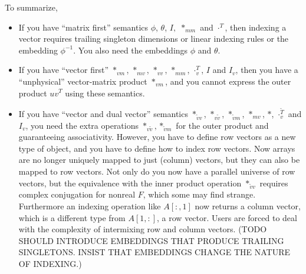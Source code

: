 To summarize,
\begin{itemize}
\item If you have ``matrix first'' semantics $\phi$, $\theta$, $I,$
$*_{mm}$ and $\cdot^{T}$, then indexing a vector requires trailing
singleton dimensions or linear indexing rules or the embedding $\phi^{-1}$.
You also need the embeddings $\phi$ and $\theta$.
\item If you have ``vector first'' $*_{vm}$, $*_{mv}$, $*_{vv}$, $*_{mm}$,
$\cdot_{v}^{T}$, $I$ and $I_{v}$, then you have a ``unphysical''
vector-matrix product $*_{vm}$, and you cannot express the outer
product $uv^{T}$ using these semantics.
\item If you have ``vector and dual vector'' semantics $*_{\tilde{v}v}$,
$*_{v\tilde{v}}$, $*_{\tilde{v}m}$, $*_{mv}$, $*$, $\cdot_{v}^{\tilde{T}}$
and $I_{v}$, you need the extra operations $*_{v\tilde{v}},*_{\tilde{v}m}$
for the outer product and guaranteeing associativity. However, you
have to define row vectors as a new type of object, and you have to
define  how to index row vectors. Now arrays are no longer uniquely
mapped to just (column) vectors, but they can also be mapped to row
vectors. Not only do you now have a parallel universe of row vectors,
but the equivalence with the inner product operation $*_{\tilde{v}v}$
requires complex conjugation for nonreal $F$, which some may find
strange. Furthermore an indexing operation like $A[:,1]$ now returns
a column vector, which is a different type from $A[1,:]$, a row vector.
Users are forced to deal with the complexity of intermixing row and
column vectors. (TODO SHOULD INTRODUCE EMBEDDINGS THAT PRODUCE TRAILING
SINGLETONS. INSIST THAT EMBEDDINGS CHANGE THE NATURE OF INDEXING.)

\end{itemize}
